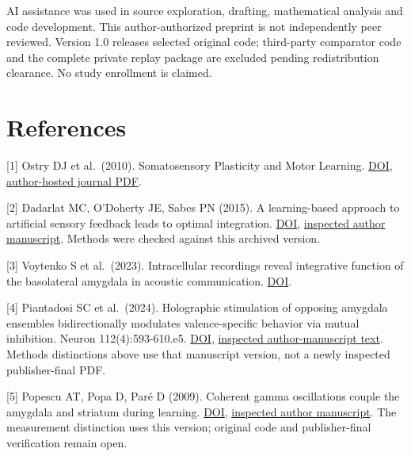 \documentclass[
  american,
  11pt,
  letterpaper,
]{article}
\begin{document}
\par

\ifdim\dimexpr\pagegoal-\pagetotal\relax<70pt\newpage\fi AI assistance was used in source exploration, drafting, mathematical analysis and code development. This author-authorized preprint is not independently peer reviewed. Version 1.0 releases selected original code; third-party comparator code and the complete private replay package are excluded pending redistribution clearance. No study enrollment is claimed.

\begingroup\small

\section{References}\label{references}

{[}1{]} Ostry DJ et al.~(2010). Somatosensory Plasticity and Motor Learning. \href{https://doi.org/10.1523/JNEUROSCI.4571-09.2010}{DOI}, \href{https://gribblelab.org/assets/files/papers/2010_JNeurosci_ODMWG.pdf}{author-hosted journal PDF}.

{[}2{]} Dadarlat MC, O'Doherty JE, Sabes PN (2015). A learning-based approach to artificial sensory feedback leads to optimal integration. \href{https://doi.org/10.1038/nn.3883}{DOI}, \href{https://pmc.ncbi.nlm.nih.gov/articles/PMC4282864/}{inspected author manuscript}. Methods were checked against this archived version.

{[}3{]} Voytenko S et al.~(2023). Intracellular recordings reveal integrative function of the basolateral amygdala in acoustic communication. \href{https://doi.org/10.1152/jn.00103.2023}{DOI}.

{[}4{]} Piantadosi SC et al.~(2024). Holographic stimulation of opposing amygdala ensembles bidirectionally modulates valence-specific behavior via mutual inhibition. Neuron 112(4):593-610.e5. \href{https://doi.org/10.1016/j.neuron.2023.11.007}{DOI}, \href{https://pmc.ncbi.nlm.nih.gov/articles/PMC10984369/}{inspected author-manuscript text}. Methods distinctions above use that manuscript version, not a newly inspected publisher-final PDF.

{[}5{]} Popescu AT, Popa D, Paré D (2009). Coherent gamma oscillations couple the amygdala and striatum during learning. \href{https://doi.org/10.1038/nn.2305}{DOI}, \href{https://pmc.ncbi.nlm.nih.gov/articles/PMC2737601/}{inspected author manuscript}. The measurement distinction uses this version; original code and publisher-final verification remain open.
\end{document}
